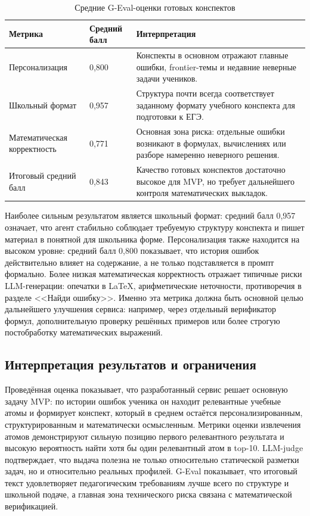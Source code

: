\documentclass[a4paper,12pt]{extarticle}
\begin{document}
\begin{table}[H]
\caption{Средние G-Eval-оценки готовых конспектов}
\label{tab:conspect_geval_results}
\centering
\small
\begin{tabular}{@{}p{5.2cm} p{2.4cm} p{6.0cm}@{}}
\toprule
Метрика & Средний балл & Интерпретация \\
\midrule
Персонализация & 0,800 & Конспекты в основном отражают главные ошибки,
frontier-темы и недавние неверные задачи учеников. \\
Школьный формат & 0,957 & Структура почти всегда соответствует заданному
формату учебного конспекта для подготовки к ЕГЭ. \\
Математическая корректность & 0,771 & Основная зона риска: отдельные ошибки
возникают в формулах, вычислениях или разборе намеренно неверного решения. \\
Итоговый средний балл & 0,843 & Качество готовых конспектов достаточно высокое
для MVP, но требует дальнейшего контроля математических выкладок. \\
\bottomrule
\end{tabular}
\end{table}

Наиболее сильным результатом является школьный формат: средний балл 0,957
означает, что агент стабильно соблюдает требуемую структуру конспекта и пишет
материал в понятной для школьника форме. Персонализация также находится на
высоком уровне: средний балл 0,800 показывает, что история ошибок действительно
влияет на содержание, а не только подставляется в промпт формально. Более низкая
математическая корректность отражает типичные риски LLM-генерации: опечатки в
LaTeX, арифметические неточности, противоречия в разделе <<Найди ошибку>>.
Именно эта метрика должна быть основной целью дальнейшего улучшения сервиса:
например, через отдельный верификатор формул, дополнительную проверку решённых
примеров или более строгую постобработку математических выражений.

\subsection{Интерпретация результатов и ограничения}

Проведённая оценка показывает, что разработанный сервис решает основную задачу
MVP: по истории ошибок ученика он находит релевантные учебные атомы и формирует
конспект, который в среднем остаётся персонализированным, структурированным и
математически осмысленным. Метрики оценки извлечения атомов демонстрируют сильную позицию
первого релевантного результата и высокую вероятность найти хотя бы один
релевантный атом в top-10. LLM-judge подтверждает, что выдача полезна не только
относительно статической разметки задач, но и относительно реальных профилей.
G-Eval показывает, что итоговый текст удовлетворяет педагогическим требованиям
лучше всего по структуре и школьной подаче, а главная зона технического риска
связана с математической верификацией.
\end{document}
